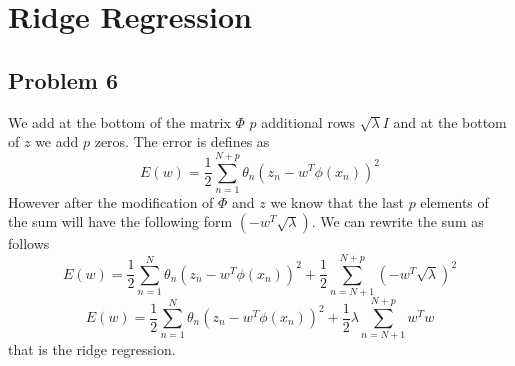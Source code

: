 \section{Ridge Regression}

\subsection*{Problem 6}
We add at the bottom of the matrix $\Phi$ $p$ additional rows $\sqrt{\lambda}I$
and at the bottom of $z$ we add $p$ zeros.
The error is defines as
\[
E(w) = \frac{1}{2}\sum^{N+p}_{n=1} \theta_n \left( z_n - w^T \phi(x_n) \right)^2 
\]
However after the modification of $\Phi$ and $z$ we know that the last $p$
elements of the sum will have the following form $(-w^T \sqrt{\lambda})$.
We can rewrite the sum as follows
\[
E(w) = \frac{1}{2}\sum^{N}_{n=1} \theta_n \left( z_n - w^T \phi(x_n) \right)^2 +
\frac{1}{2}\sum^{N+p}_{n=N+1} \left( -w^T \sqrt{\lambda} \right)^2 
\]
\[
E(w) = \frac{1}{2}\sum^{N}_{n=1} \theta_n \left( z_n - w^T \phi(x_n) \right)^2 +
\frac{1}{2}\lambda\sum^{N+p}_{n=N+1}  w^T w 
\]
that is the ridge regression.
